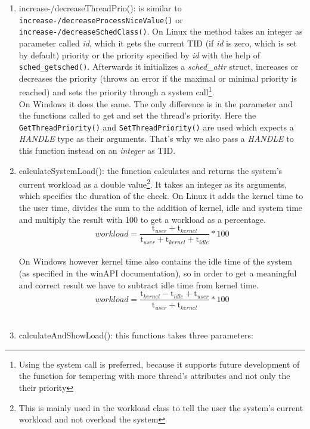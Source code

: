 \begin{enumerate}
\begin{enumerate}
		\item increase-/decreaseThreadPrio(): is similar to \texttt{increase-/decreaseProcessNiceValue()} or \texttt{increase-/decreaseSchedClass()}.
		On Linux the method takes an integer as parameter called \textit{id}, which it gets the current TID (if \textit{id} is zero, which is set by default) priority or the priority specified by \textit{id} with the help of \texttt{sched\_getsched()}. Afterwards it initializes a \textit{sched\_attr} struct, increases or decreases the priority (throws an error if the maximal or minimal priority is reached) and sets the priority through a system call\footnote{Using the system call is preferred, because it supports future development of the function for tempering with more thread's attributes and not only the their priority}. \\
		On Windows it does the same. The only difference is in the parameter and the functions called to get and set the thread's priority. Here the \texttt{GetThreadPriority()} and \texttt{SetThreadPriority()} are used which expects a \textit{HANDLE} type as their arguments. That's why we also pass a \textit{HANDLE} to this function instead on an \textit{integer} as TID.    
		\item calculateSystemLoad(): the function calculates and returns the system's current workload as a double value\footnote{This is mainly used in the workload class to tell the user the system's current workload and not overload the system}. It takes an integer as its arguments, which specifies the duration of the check.
		On Linux it adds the kernel time to the user time, divides the sum to the addition of kernel, idle and system time and multiply the result with 100 to get a workload as a percentage. 
		\begin{equation}
		workload =  \frac{\mathrm{t}_{user}+\mathrm{t}_{kernel}}{\mathrm{t}_{user}+\mathrm{t}_{kernel}+\mathrm{t}_{idle}}*100
		\end{equation}\\
		On Windows however kernel time also contains the idle time of the system (as specified in the winAPI documentation), so in order to get a meaningful and correct result we have to subtract idle time from kernel time.
		\begin{equation}
		workload =  \frac{\mathrm{t}_{kernel}-\mathrm{t}_{idle}+\mathrm{t}_{user}}{\mathrm{t}_{user}+\mathrm{t}_{kernel}}*100
		\end{equation}\\
		\item calculateAndShowLoad(): this functions takes three parameters:

\end{enumerate}
\end{enumerate}
